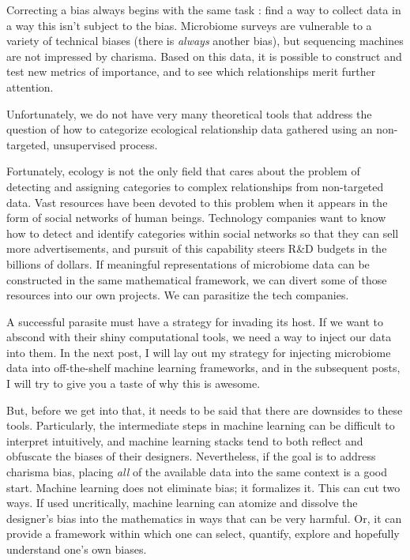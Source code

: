 \documentclass[
10pt, %
a4paper, %
oneside, %
headinclude,footinclude, %
BCOR5mm, %
]{scrartcl}
\begin{document}
Correcting a bias always begins with the same task : find a way to collect data in a way this isn't subject to the bias. Microbiome surveys are vulnerable to a variety of technical biases (there is {\em always} another bias), but sequencing machines are not impressed by charisma. Based on this data, it is possible to construct and test new metrics of importance, and to see which relationships merit further attention.

Unfortunately, we do not have very many theoretical tools that address the question of how to categorize ecological relationship data gathered using an non-targeted, unsupervised process.

Fortunately, ecology is not the only field that cares about the problem of detecting and assigning categories to complex relationships from non-targeted data. Vast resources have been devoted to this problem when it appears in the form of social networks of human beings. Technology companies want to know how to detect and identify categories within social networks so that they can sell more advertisements, and pursuit of this capability steers R\&D budgets in the billions of dollars. If meaningful representations of microbiome data can be constructed in the same mathematical framework, we can divert some of those resources into our own projects. We can parasitize the tech companies.

A successful parasite must have a strategy for invading its host. If we want to abscond with their shiny computational tools, we need a way to inject our data into them. In the next post, I will lay out my strategy for injecting microbiome data into off-the-shelf machine learning frameworks, and in the subsequent posts, I will try to give you a taste of why this is awesome.


But, before we get into that, it needs to be said that there are downsides to these tools. Particularly, the intermediate steps in machine learning can be difficult to interpret intuitively, and machine learning stacks tend to both reflect and obfuscate the biases of their designers. Nevertheless, if the goal is to address charisma bias, placing {\em all} of the available data into the same context is a good start. Machine learning does not eliminate bias; it formalizes it. This can cut two ways. If used uncritically, machine learning can atomize and dissolve the designer's bias into the mathematics in ways that can be very harmful. Or, it can provide a framework within which one can select, quantify, explore and hopefully understand one's own biases.
\end{document}

